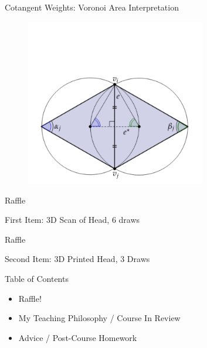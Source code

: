 \documentclass{beamer}
\begin{document}
\begin{frame}{Cotangent Weights: Voronoi Area Interpretation}

\begin{figure}[t]
    \includegraphics[width=0.7\textwidth]{CotWeights.png}
\end{figure}

\end{frame}


\begin{frame}{Raffle}

First Item: 3D Scan of Head, 6 draws

\end{frame}

\begin{frame}{Raffle}

Second Item: 3D Printed Head, 3 Draws

\end{frame}


\begin{frame}{Table of Contents}

\begin{itemize}[label=$\vartriangleright$]
	\item Raffle!
\end{itemize}

\begin{itemize}[label=$\blacktriangleright$]
	\item My Teaching Philosophy / Course In Review
\end{itemize}


\begin{itemize}[label=$\vartriangleright$]
	\item Advice / Post-Course Homework
\end{itemize}

\end{frame}
\end{document}
